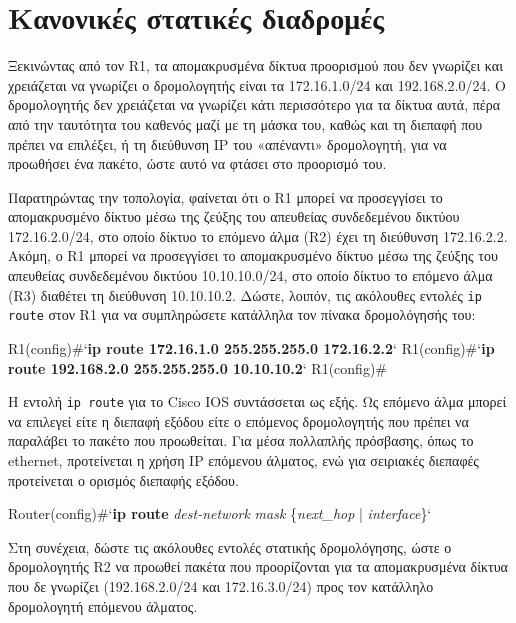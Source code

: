 \documentclass{EdipyLabs} %
\begin{document}
\section{Κανονικές στατικές διαδρομές}

Ξεκινώντας από τον R1, τα απομακρυσμένα δίκτυα προορισμού που δεν γνωρίζει και χρειάζεται να γνωρίζει ο δρομολογητής είναι τα 172.16.1.0/24 και 192.168.2.0/24. Ο δρομολογητής δεν χρειάζεται να γνωρίζει κάτι περισσότερο για τα δίκτυα αυτά, πέρα από την ταυτότητα του καθενός μαζί με τη μάσκα του, καθώς και τη διεπαφή που πρέπει να επιλέξει, ή τη διεύθυνση IP του «απέναντι» δρομολογητή, για να προωθήσει ένα πακέτο, ώστε αυτό να φτάσει στο προορισμό του.

Παρατηρώντας την τοπολογία, φαίνεται ότι ο R1 μπορεί να προσεγγίσει το απομακρυσμένο δίκτυο  μέσω της ζεύξης του απευθείας συνδεδεμένου δικτύου 172.16.2.0/24, στο οποίο δίκτυο το επόμενο άλμα (R2) έχει τη διεύθυνση 172.16.2.2. Ακόμη, ο R1 μπορεί να προσεγγίσει το απομακρυσμένο δίκτυο  μέσω της ζεύξης του απευθείας συνδεδεμένου δικτύου 10.10.10.0/24, στο οποίο δίκτυο το επόμενο άλμα (R3) διαθέτει τη διεύθυνση 10.10.10.2. Δώστε, λοιπόν, τις ακόλουθες εντολές \texttt{ip route} στον R1 για να συμπληρώσετε κατάλληλα τον πίνακα δρομολόγησής του:

\begin{CommandBox}
R1(config)#`\textbf{ip route 172.16.1.0 255.255.255.0 172.16.2.2}`
R1(config)#`\textbf{ip route 192.168.2.0 255.255.255.0 10.10.10.2}`
R1(config)#
\end{CommandBox}

Η εντολή \texttt{ip route} για το Cisco IOS συντάσσεται ως εξής. Ως επόμενο άλμα μπορεί να επιλεγεί είτε η διεπαφή εξόδου είτε ο επόμενος δρομολογητής που πρέπει να παραλάβει το πακέτο που προωθείται. Για μέσα πολλαπλής πρόσβασης, όπως το ethernet, προτείνεται η χρήση IP επόμενου άλματος, ενώ για σειριακές διεπαφές προτείνεται ο ορισμός διεπαφής εξόδου.

\begin{CommandBox}
Router(config)#`\textbf{ip route} \textit{dest-network} \textit{mask} \{\textit{next\_hop} | \textit{interface}\}`
\end{CommandBox}

Στη συνέχεια, δώστε τις ακόλουθες εντολές στατικής δρομολόγησης, ώστε ο δρομολογητής R2 να προωθεί πακέτα που προορίζονται για τα απομακρυσμένα δίκτυα που δε γνωρίζει (192.168.2.0/24 και 172.16.3.0/24) προς τον κατάλληλο δρομολογητή επόμενου άλματος.
\end{document}
